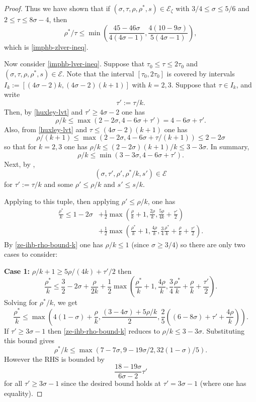 \documentclass[a4paper, 10pt]{amsart}
\newcommand{\Energy}{\mathcal{E}}
\begin{document}
\begin{proof}
Thus we have shown that if $(\sigma, \tau, \rho, \rho^*, s) \in \Energy_\zeta$ with $3/4 \le \sigma \le 5/6$ and $2 \le \tau \le 8\sigma - 4$, then
\[
\rho^*/\tau \le \min\left(\frac{45 - 46\sigma}{4(4\sigma - 1)}, \frac{4(10 - 9\sigma)}{5(4\sigma - 1)}\right),
\]
which is \eqref{imphb-zlver-ineq}.

Now consider \eqref{imphb-lver-ineq}. Suppose that $\tau_0 \le \tau \le 2\tau_0$ and $(\sigma, \tau, \rho, \rho^*, s) \in \Energy$. Note that the interval $[\tau_0, 2\tau_0]$ is covered by intervals $I_k := [(4\sigma - 2)k, (4\sigma - 2)(k + 1)]$ with $k = 2, 3$. Suppose that $\tau \in I_k$, and write 
\[
\tau' := \tau/k.
\]
Then, by \eqref{huxley-lvt} and $\tau' \ge 4\sigma - 2$ one has
\[
\rho/k \le \max(2 - 2\sigma, 4 - 6\sigma + \tau') = 4 - 6\sigma + \tau'.
\]
Also, from \eqref{huxley-lvt} and $\tau \le (4\sigma - 2)(k + 1)$ one has
\[
\rho/(k + 1) \le \max(2 - 2\sigma, 4 - 6\sigma + \tau/(k + 1)) \le 2 - 2\sigma
\]
so that for $k = 2,3$ one has $\rho/k \le (2 - 2\sigma)(k + 1)/k \le 3 - 3\sigma$.
In summary,
\begin{equation}\label{ze-ihb-rho-bound-k}
\rho/k \le \min(3 - 3\sigma, 4 - 6\sigma + \tau').
\end{equation}
Next, by ,
\[
(\sigma, \tau', \rho', \rho^*/k, s') \in \Energy
\]
for $\tau' := \tau/k$ and some $\rho' \le \rho/k$ and $s' \le s/k$.

Applying  to this tuple, then applying $\rho' \le \rho/k$, one has
\begin{align*}
\frac{\rho^*}{k} \leq 1-2\sigma &+ \frac{1}{2}\max\left(\frac{\rho}{k}+1, \frac{2\rho}{k}, \frac{5\rho}{4k} + \frac{\tau'}{2}\right) \\
&+ \frac{1}{2}\max\left(\frac{\rho^*}{k}+1, \frac{4\rho}{k}, \frac{3}{4}\frac{\rho^*}{k} +\frac{\rho}{k}+\frac{\tau'}{2}\right).
\end{align*}
By \eqref{ze-ihb-rho-bound-k} one has $\rho/k \le 1$ (since $\sigma \ge 3/4$) so there are only two cases to consider:

\textbf{Case 1:} $\rho/k + 1 \ge 5\rho/(4k) + \tau'/2$ then
\[
\frac{\rho^*}{k} \le \frac{3}{2} - 2\sigma + \frac{\rho}{2k} + \frac{1}{2}\max\left(\frac{\rho^*}{k}+1, \frac{4\rho}{k}, \frac{3}{4}\frac{\rho^*}{k} +\frac{\rho}{k}+\frac{\tau'}{2}\right).
\]
Solving for $\rho^*/k$, we get
\[
\frac{\rho^*}{k} \le \max\left(4(1 - \sigma) + \frac{\rho}{k}, \frac{(3 - 4\sigma) + 5\rho/k}{2}, \frac{2}{5}((6 - 8\sigma) + \tau' + \frac{4\rho}{k})\right).
\]
If $\tau' \ge 3\sigma - 1$ then \eqref{ze-ihb-rho-bound-k} reduces to $\rho/k \le 3-3\sigma$. Substituting this bound gives
\[
\rho^*/k \le \max(7 - 7\sigma, 9 - 19\sigma/2, 32(1 - \sigma)/5).
\]
However the RHS is bounded by 
\begin{equation}\label{ze-ihb-rho-1}
\frac{18 - 19\sigma}{6\sigma - 2}\tau'
\end{equation}
for all $\tau' \ge 3\sigma - 1$ since the desired bound holds at $\tau' = 3\sigma - 1$ (where one has equality).


\end{proof}
\end{document}
